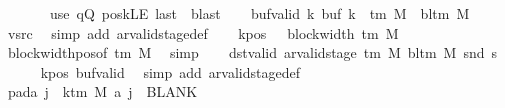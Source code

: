 \begin{isabellebody}
\ \ \ \ \ \ \ {\isacharparenleft}{\kern0pt}use\ qQ\ poskLE\ last\ \ blast{\isacharparenright}{\kern0pt}\isanewline
\ \ \isamarkupfalse%
\ buf{\isacharunderscore}{\kern0pt}valid{\isacharcolon}{\kern0pt}\ {\isachardoublequoteopen}{\isasymforall}k{\isachardot}{\kern0pt}\ buf\ k\ {\isasymin}\ {\isasymGamma}{\isacharunderscore}{\kern0pt}tm\ M\ {\isasymunion}\ {\isacharbraceleft}{\kern0pt}bl{\isacharunderscore}{\kern0pt}tm\ M{\isacharbraceright}{\kern0pt}{\isachardoublequoteclose}\isanewline
\ \ \ \ \isamarkupfalse%
\ vsrc\ \isamarkupfalse%
\ {\isacharparenleft}{\kern0pt}simp\ add{\isacharcolon}{\kern0pt}\ ar{\isacharunderscore}{\kern0pt}valid{\isacharunderscore}{\kern0pt}stage{\isacharunderscore}{\kern0pt}def{\isacharparenright}{\kern0pt}\isanewline
\ \ \isamarkupfalse%
\ kpos{\isacharcolon}{\kern0pt}\ {\isachardoublequoteopen}{}\ {\isacharless}{\kern0pt}\ block{\isacharunderscore}{\kern0pt}width\ {\isacharparenleft}{\kern0pt}{\isasymGamma}{\isacharunderscore}{\kern0pt}tm\ M{\isacharparenright}{\kern0pt}{\isachardoublequoteclose}\ \isamarkupfalse%
\ block{\isacharunderscore}{\kern0pt}width{\isacharunderscore}{\kern0pt}pos{\isacharbrackleft}{\kern0pt}of\ {\isachardoublequoteopen}{\isasymGamma}{\isacharunderscore}{\kern0pt}tm\ M{\isachardoublequoteclose}{\isacharbrackright}{\kern0pt}\ \isamarkupfalse%
\ simp\isanewline
\ \ \isamarkupfalse%
\ dst{\isacharunderscore}{\kern0pt}valid{\isacharcolon}{\kern0pt}\ {\isachardoublequoteopen}ar{\isacharunderscore}{\kern0pt}valid{\isacharunderscore}{\kern0pt}stage\ {\isacharparenleft}{\kern0pt}{\isasymGamma}{\isacharunderscore}{\kern0pt}tm\ M{\isacharparenright}{\kern0pt}\ {\isacharparenleft}{\kern0pt}bl{\isacharunderscore}{\kern0pt}tm\ M{\isacharparenright}{\kern0pt}\ {\isacharparenleft}{\kern0pt}snd\ {\isacharquery}{\kern0pt}s{\isacharprime}{\kern0pt}{\isacharparenright}{\kern0pt}{\isachardoublequoteclose}\isanewline
\ \ \ \ \isamarkupfalse%
\ kpos\ buf{\isacharunderscore}{\kern0pt}valid\ \isamarkupfalse%
\ {\isacharparenleft}{\kern0pt}simp\ add{\isacharcolon}{\kern0pt}\ ar{\isacharunderscore}{\kern0pt}valid{\isacharunderscore}{\kern0pt}stage{\isacharunderscore}{\kern0pt}def{\isacharparenright}{\kern0pt}\isanewline
\ \ \isamarkupfalse%
\ pad{\isacharunderscore}{\kern0pt}a{\isacharcolon}{\kern0pt}\ {\isachardoublequoteopen}{\isasymforall}j\ {\isasymge}\ k{\isacharunderscore}{\kern0pt}tm\ M{\isachardot}{\kern0pt}\ {\isacharquery}{\kern0pt}a\ j\ {\isacharequal}{\kern0pt}\ BLANK{}{\isachardoublequoteclose}\ \isamarkupfalse%

\end{isabellebody}
